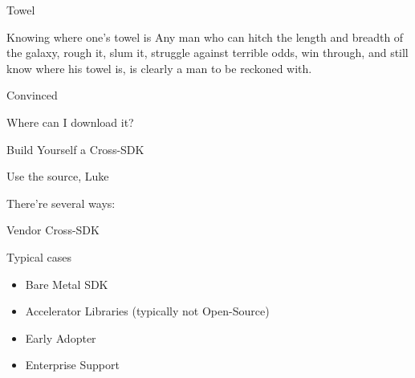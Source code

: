 \documentclass[ngerman,xcolor={table,dvipsnames},smaller,compress,hyperref={bookmarks,colorlinks}]{beamer}%
\begin{document}
\begin{frame}[fragile]{Towel}
\begin{block}{Knowing where one's towel is}
Any man who can hitch the length and breadth of the galaxy, rough it, slum it, struggle against terrible odds, win through, and still know where his towel is, is clearly a man to be reckoned with.
\end{block}
\end{frame}

\begin{frame}[fragile]{Convinced}

\begin{block}{Where can I download it?}


\end{block}
\end{frame}

\begin{frame}[fragile]{Build Yourself a Cross-SDK}
\begin{block}{Use the source, Luke}

There're several ways:

\begin{itemize}
\end{itemize}

\end{block}
\end{frame}

\begin{frame}[fragile]{Vendor Cross-SDK}
\begin{block}{Typical cases}

\begin{itemize}
\item Bare Metal SDK
\item Accelerator Libraries (typically not Open-Source)
\item Early Adopter
\item Enterprise Support
\end{itemize}

\end{block}
\end{frame}
\end{document}
